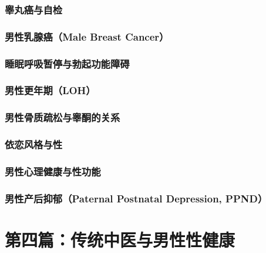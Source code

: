 \section{睾丸癌与自检}

\section{男性乳腺癌（Male Breast Cancer）}

\section{睡眠呼吸暂停与勃起功能障碍}

\section{男性更年期（LOH）}

\section{男性骨质疏松与睾酮的关系}

\section{依恋风格与性}

\section{男性心理健康与性功能}

\section{男性产后抑郁（Paternal Postnatal Depression, PPND）}

\part*{第四篇：传统中医与男性性健康}

